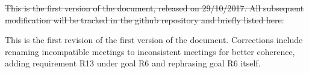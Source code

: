 \st{This is the first version of the document, released on 29/10/2017.
All subsequent modification will be tracked in the github repository and briefly listed here.}

This is the first revision of the first version of the document. Corrections include renaming incompatible meetings to inconsistent meetings for better coherence, adding requirement R13 under goal R6 and rephrasing goal R6 itself.